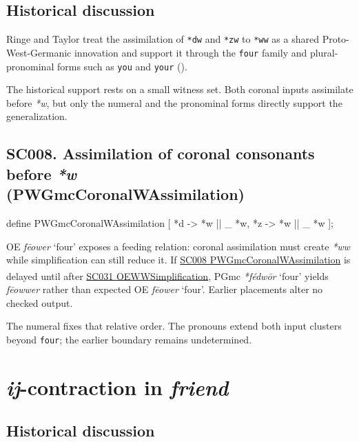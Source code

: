 \documentclass[
  british,
  a4paper,
  openany]{book}
\providecommand{\Pred}[1]{\textsuperscript{\dag}\emph{#1}}
\providecommand{\Recon}[1]{\emph{*#1}}
{\catcode`→=\active \global\def→{\ensuremath{\rightarrow}}}
\providecommand{\texorpdfstring}[2]{#1}
\DeclareRobustCommand{\CAPRRuleHeading}[2]{%
  #1\texorpdfstring{\\(#2)}{ (#2)}%
}
\providecommand{\Pred}[1]{\textsuperscript{\dag}\emph{#1}}
\providecommand{\Recon}[1]{\emph{*#1}}
{\catcode`→=\active \global\def→{\ensuremath{\rightarrow}}}
\begin{document}
\subsection{Historical discussion}\label{historical-discussion-5}

Ringe and Taylor treat the assimilation of \texttt{*dw} and \texttt{*zw}
to \texttt{*ww} as a shared Proto-West-Germanic innovation and support
it through the \texttt{four} family and plural-pronominal forms such as
\texttt{you} and \texttt{your} ().

The historical support rests on a small witness set. Both coronal inputs
assimilate before \emph{*w}, but only the numeral and the pronominal
forms directly support the generalization.

\subsection{\texorpdfstring{\CAPRRuleHeading{SC008. Assimilation of coronal consonants before \emph{*w}}{PWGmcCoronalWAssimilation}}{}}\label{rule-PWGmcCoronalWAssimilation}

\begin{ReaderFacingFoma}
define PWGmcCoronalWAssimilation [
    {*d} -> {*w} || _ {*w},
    {*z} -> {*w} || _ {*w}
];
\end{ReaderFacingFoma}

OE \emph{fēower} `four' exposes a feeding relation: coronal assimilation
must create \emph{*ww} while simplification can still reduce it. If
\hyperref[rule-PWGmcCoronalWAssimilation]{SC008
PWGmcCoronalWAssimilation} is delayed until after
\hyperref[rule-OEWWSimplification]{SC031 OEWWSimplification}, PGmc
\Recon{fédwōr} `four' yields \Pred{fēowwer} rather than expected OE
\emph{fēower} `four'. Earlier placements alter no checked output.

The numeral fixes that relative order. The pronouns extend both input
clusters beyond \texttt{four}; the earlier boundary remains
undetermined.

\newpage

\section{\texorpdfstring{\emph{ij}-contraction in
\emph{friend}}{-contraction in }}\label{contraction-in}

\subsection{Historical discussion}\label{historical-discussion-6}
\end{document}
